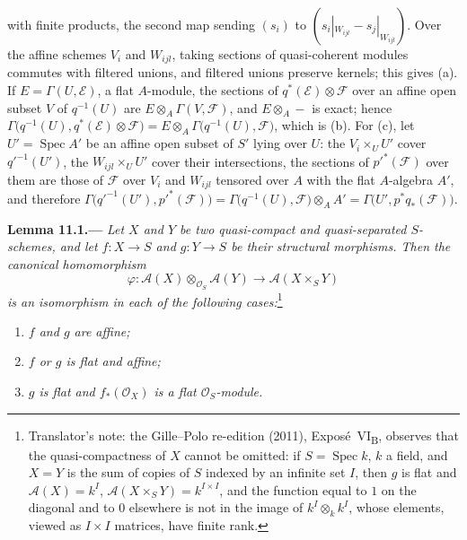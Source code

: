 with finite products, the second map sending \((s_i)\) to
\((s_i|_{W_{ijl}}-s_j|_{W_{ijl}})\). Over the affine schemes \(V_i\) and \(W_{ijl}\), taking sections of
quasi-coherent modules commutes with filtered unions, and filtered unions preserve kernels; this gives (a).
If \(E=\Gamma(U,\mathcal E)\), a flat \(A\)-module, the sections of \(q^*(\mathcal E)\otimes\mathcal F\) over an
affine open subset \(V\) of \(q^{-1}(U)\) are \(E\otimes_A\Gamma(V,\mathcal F)\), and \(E\otimes_A-\) is exact; hence
\(\Gamma\bigl(q^{-1}(U),q^*(\mathcal E)\otimes\mathcal F\bigr)=E\otimes_A\Gamma\bigl(q^{-1}(U),\mathcal F\bigr)\), which
is (b). For (c), let \(U'=\operatorname{Spec}A'\) be an affine open subset of \(S'\) lying over \(U\): the
\(V_i\times_UU'\) cover \(q'^{-1}(U')\), the \(W_{ijl}\times_UU'\) cover their intersections, the sections of
\(p'^*(\mathcal F)\) over them are those of \(\mathcal F\) over \(V_i\) and \(W_{ijl}\) tensored over \(A\) with the
flat \(A\)-algebra \(A'\), and therefore
\(\Gamma\bigl(q'^{-1}(U'),p'^*(\mathcal F)\bigr)=\Gamma\bigl(q^{-1}(U),\mathcal F\bigr)\otimes_AA'
=\Gamma\bigl(U',p^*q_*(\mathcal F)\bigr)\).

\medskip
{}\label{lem:sga3-VIB-11.1}%
\noindent\textbf{Lemma 11.1.---}
\emph{Let \(X\) and \(Y\) be two quasi-compact and
quasi-separated \(S\)-schemes, and let \(f:X\to S\) and
\(g:Y\to S\) be their structural morphisms. Then the
canonical homomorphism}
\label{form:sga3-VIB-11.1-phi}%
\[
  \varphi:
  \mathcal A(X)\otimes_{\mathcal O_S}\mathcal A(Y)
    \longrightarrow
  \mathcal A(X\times_SY)
\]
\emph{is an isomorphism in each of the following cases:}\footnote{Translator's note: the Gille--Polo re-edition
(2011), Expos\'e~VI\textsubscript{B}, observes that the quasi-compactness of \(X\) cannot be omitted: if
\(S=\operatorname{Spec}k\), \(k\) a field, and \(X=Y\) is the sum of copies of \(S\) indexed by an infinite set
\(I\), then \(g\) is flat and \(\mathcal A(X)=k^I\), \(\mathcal A(X\times_SY)=k^{I\times I}\), and the function
equal to \(1\) on the diagonal and to \(0\) elsewhere is not in the image of \(k^I\otimes_kk^I\), whose
elements, viewed as \(I\times I\) matrices, have finite rank.}
\begin{enumerate}
\item[\textup{(a)}]\label{concl:sga3-VIB-11.1-a}
  \emph{\(f\) and \(g\) are affine;}

\item[\textup{(b)}]\label{concl:sga3-VIB-11.1-b}
  \emph{\(f\) or \(g\) is flat and affine;}

\item[\textup{(c)}]\label{concl:sga3-VIB-11.1-c}
  \emph{\(g\) is flat and \(f_*(\mathcal O_X)\) is a flat
  \(\mathcal O_S\)-module.}
\end{enumerate}

